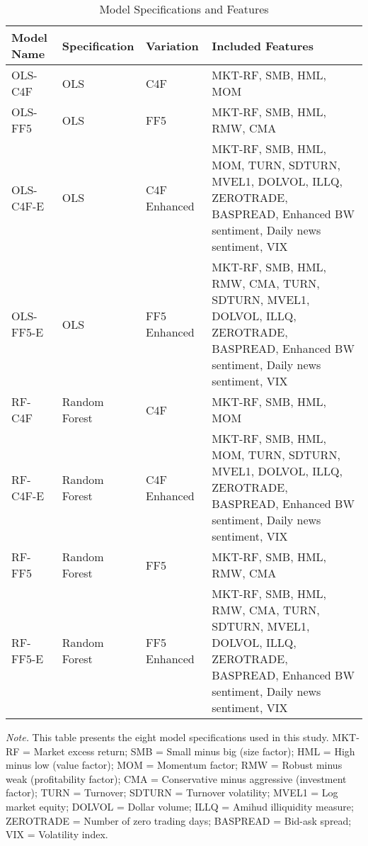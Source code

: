 \begin{table}[H]
\centering
\caption{Model Specifications and Features}
\label{tab:model_specifications}
\footnotesize
\begin{tabular}{p{2.2cm}p{1.8cm}p{2.2cm}p{7.5cm}}
\toprule
\textbf{Model Name} & \textbf{Specification} & \textbf{Variation} & \textbf{Included Features} \\
\midrule

OLS-C4F & OLS & C4F & MKT-RF, SMB, HML, MOM \\
\addlinespace

OLS-FF5 & OLS & FF5 & MKT-RF, SMB, HML, RMW, CMA \\
\addlinespace

OLS-C4F-E & OLS & C4F Enhanced & MKT-RF, SMB, HML, MOM, TURN, SDTURN, MVEL1, DOLVOL, ILLQ, ZEROTRADE, BASPREAD, Enhanced BW sentiment, Daily news sentiment, VIX \\
\addlinespace

OLS-FF5-E & OLS & FF5 Enhanced & MKT-RF, SMB, HML, RMW, CMA, TURN, SDTURN, MVEL1, DOLVOL, ILLQ, ZEROTRADE, BASPREAD, Enhanced BW sentiment, Daily news sentiment, VIX \\
\addlinespace

RF-C4F & Random Forest & C4F & MKT-RF, SMB, HML, MOM \\
\addlinespace

RF-C4F-E & Random Forest & C4F Enhanced & MKT-RF, SMB, HML, MOM, TURN, SDTURN, MVEL1, DOLVOL, ILLQ, ZEROTRADE, BASPREAD, Enhanced BW sentiment, Daily news sentiment, VIX \\
\addlinespace

RF-FF5 & Random Forest & FF5 & MKT-RF, SMB, HML, RMW, CMA \\
\addlinespace

RF-FF5-E & Random Forest & FF5 Enhanced & MKT-RF, SMB, HML, RMW, CMA, TURN, SDTURN, MVEL1, DOLVOL, ILLQ, ZEROTRADE, BASPREAD, Enhanced BW sentiment, Daily news sentiment, VIX \\

\bottomrule
\end{tabular}

\vspace{0.5em}
\begin{minipage}{\textwidth}
\small
\textit{Note.} This table presents the eight model specifications used in this study. MKT-RF = Market excess return; SMB = Small minus big (size factor); HML = High minus low (value factor); MOM = Momentum factor; RMW = Robust minus weak (profitability factor); CMA = Conservative minus aggressive (investment factor); TURN = Turnover; SDTURN = Turnover volatility; MVEL1 = Log market equity; DOLVOL = Dollar volume; ILLQ = Amihud illiquidity measure; ZEROTRADE = Number of zero trading days; BASPREAD = Bid-ask spread; VIX = Volatility index.
\end{minipage}

\end{table}
